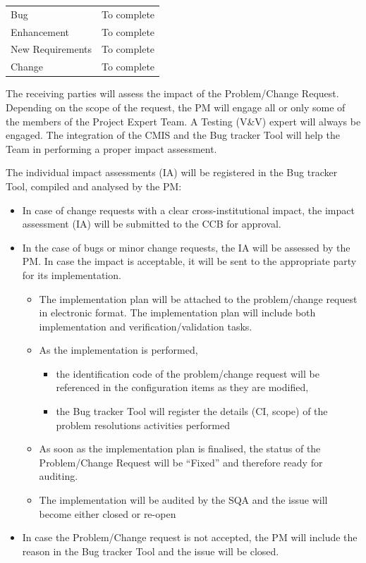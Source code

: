 \documentclass{template/openetcs_article}
\begin{document}
\begin{flushleft}
\begin{tabular}{|m{3cm}|m{11cm}|}
\hline
\rowcolor{myblue}
\multicolumn{2}{|c|}{Classification}\\\hline
Bug &
To complete\\\hline
Enhancement &
To complete\\\hline
New Requirements &
To complete\\\hline
Change &
To complete\\\hline
\end{tabular}
\end{flushleft}

The receiving parties will assess the impact of the Problem/Change Request. Depending on the scope of the request, the PM will engage all or only some of the members of the Project Expert Team. A Testing (V\&V) expert will always be engaged. The integration of the CMIS and the Bug tracker Tool will help the Team in performing a proper impact assessment. 


The individual impact assessments (IA) will be registered in the Bug tracker Tool, compiled and analysed by the PM:

\begin{itemize}
\item In case of change requests with a clear cross-institutional impact, the impact assessment (IA) will be submitted to the CCB for approval.
\item In the case of bugs or minor change requests, the IA will be assessed by the PM. In case the impact is acceptable, it will be sent to the appropriate party for its implementation.
\begin{itemize}
\item The implementation plan will be attached to the problem/change request in electronic format. The implementation plan will include both implementation and verification/validation tasks.
\item As the implementation is performed, 
\begin{itemize}
\item the identification code of the problem/change request will be referenced in the configuration items as they are modified, 
\item the Bug tracker Tool will register the details (CI, scope) of the problem resolutions activities performed
\end{itemize}
\item As soon as the implementation plan is finalised, the status of the Problem/Change Request will be {\textquotedblleft}Fixed{\textquotedblright} and therefore ready for auditing.
\item The implementation will be audited by the SQA and the issue will become either closed or re-open
\end{itemize}
\item In case the Problem/Change request is not accepted, the PM will include the reason in the Bug tracker Tool and the issue will be closed. 
\end{itemize}
\end{document}
